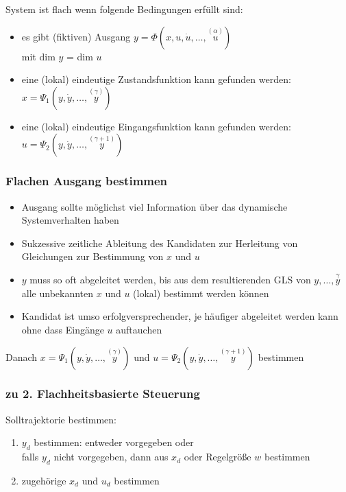 \documentclass[german]{latex4ei/latex4ei_sheet}
\newcommand{\os}[2]{\ensuremath{\overset{#1}{#2}}}
\begin{document}
System ist flach wenn folgende Bedingungen erfüllt sind:
\begin{itemize}
  \item es gibt (fiktiven) Ausgang $y = \Phi(x, u, \dot{u}, \dots, \os{(\alpha)}{u})$ \\
    mit dim $y$ = dim $u$
  \item eine (lokal) eindeutige Zustandsfunktion kann gefunden werden: \\
    $x = \Psi_1 (y, \dot{y}, \dots, \os{(\gamma)}{y})$
  \item eine (lokal) eindeutige Eingangsfunktion kann gefunden werden: \\
    $u = \Psi_2 (y, \dot{y}, \dots, \os{(\gamma +1)}{y})$
\end{itemize}

\subsubsection*{Flachen Ausgang bestimmen}
\begin{itemize}
  \item Ausgang sollte möglichst viel Information über das dynamische Systemverhalten haben
  \item Sukzessive zeitliche Ableitung des Kandidaten zur Herleitung von Gleichungen zur Bestimmung von $x$ und $u$
  \item $y$ muss so oft abgeleitet werden, bis aus dem resultierenden GLS von $y,\dots,\os{\gamma}{y}$ alle unbekannten $x$ und $u$ (lokal) bestimmt werden können
  \item Kandidat ist umso erfolgversprechender, je häufiger abgeleitet werden kann ohne dass Eingänge $u$ auftauchen
\end{itemize}

Danach $x = \Psi_1 (y, \dot{y}, \dots, \os{(\gamma)}{y})$ und $u = \Psi_2 (y, \dot{y}, \dots, \os{(\gamma +1)}{y})$ bestimmen

\subsubsection*{zu 2. Flachheitsbasierte Steuerung}

Solltrajektorie bestimmen:
\begin{enumerate}
  \item $y_d$ bestimmen: entweder vorgegeben oder\\
    falls $y_d$ nicht vorgegeben, dann aus $x_d$ oder Regelgröße $w$ bestimmen
  \item zugehörige $x_d$ und $u_d$ bestimmen
\end{enumerate}
\end{document}

